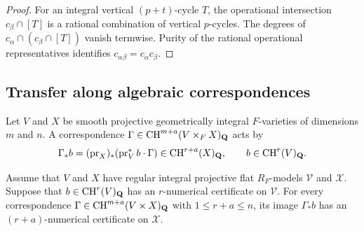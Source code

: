 \begin{proof}
For an integral vertical $(p+t)$-cycle $T$, the operational
intersection $c_\beta\cap[T]$ is a rational combination of
vertical $p$-cycles.  The degrees of
$c_\alpha\cap(c_\beta\cap[T])$ vanish termwise.  Purity of
the rational operational representatives identifies
$c_{\alpha\beta}=c_\alpha c_\beta$.
\end{proof}

\subsection{Transfer along algebraic correspondences}

Let $V$ and $X$ be smooth projective geometrically integral
$F$-varieties of dimensions $m$ and $n$.  A correspondence
$\Gamma\in\operatorname{CH}^{m+a}(V\times_F X)_{\mathbf Q}$ acts by
\[
 \Gamma_*b=(\operatorname{pr}_X)_*
             (\operatorname{pr}_V^*b\cdot\Gamma)
       \in\operatorname{CH}^{r+a}(X)_{\mathbf Q},
       \qquad b\in\operatorname{CH}^r(V)_{\mathbf Q}.
\]

\begin{proposition}
\label{prop:correspondence-transfer}
Assume that $V$ and $X$ have regular integral projective flat
$R_F$-models $\mathcal V$ and $\mathcal X$.  Suppose that
$b\in\operatorname{CH}^r(V)_{\mathbf Q}$ has an $r$-numerical certificate
on $\mathcal V$.  For every correspondence
$\Gamma\in\operatorname{CH}^{m+a}(V\times X)_{\mathbf Q}$ with
$1\le r+a\le n$, its image $\Gamma_*b$ has an
$(r+a)$-numerical certificate on $\mathcal X$.
\end{proposition}

